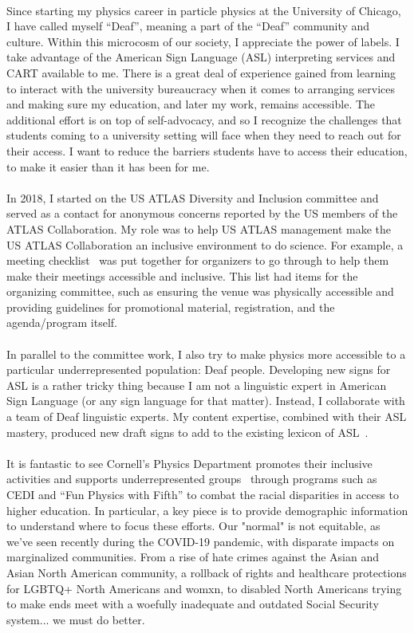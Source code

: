 \documentclass[10pt,a4paper,sans]{moderncv} %
\begin{document}
\\
Since starting my physics career in particle physics at the University of Chicago, I have called myself ``Deaf'', meaning a part of the ``Deaf'' community and culture. Within this microcosm of our society, I appreciate the power of labels. I take advantage of the American Sign Language (ASL) interpreting services and CART available to me. There is a great deal of experience gained from learning to interact with the university bureaucracy when it comes to arranging services and making sure my education, and later my work, remains accessible. The additional effort is on top of self-advocacy, and so I recognize the challenges that students coming to a university setting will face when they need to reach out for their access. I want to reduce the barriers students have to access their education, to make it easier than it has been for me.
\\
\\
In 2018, I started on the US ATLAS Diversity and Inclusion committee and served as a contact for anonymous concerns reported by the US members of the ATLAS Collaboration. My role was to help US ATLAS management make the US ATLAS Collaboration an inclusive environment to do science. For example, a meeting checklist~\cite{Assamagan:2022oka} was put together for organizers to go through to help them make their meetings accessible and inclusive. This list had items for the organizing committee, such as ensuring the venue was physically accessible and providing guidelines for promotional material, registration, and the agenda/program itself.
\\
\\
In parallel to the committee work, I also try to make physics more accessible to a particular underrepresented population: Deaf people. Developing new signs for ASL is a rather tricky thing because I am not a linguistic expert in American Sign Language (or any sign language for that matter). Instead, I collaborate with a team of Deaf linguistic experts. My content expertise, combined with their ASL mastery, produced new draft signs to add to the existing lexicon of ASL~\cite{ICPS2021, MatterInterpretation}.
\\
\\
It is fantastic to see Cornell's Physics Department promotes their inclusive activities and supports underrepresented groups~\cite{diversitypage} through programs such as CEDI and ``Fun Physics with Fifth'' to combat the racial disparities in access to higher education. In particular, a key piece is to provide demographic information to understand where to focus these efforts. Our "normal" is not equitable, as we've seen recently during the COVID-19 pandemic, with disparate impacts on marginalized communities. From a rise of hate crimes against the Asian and Asian North American community, a rollback of rights and healthcare protections for LGBTQ+ North Americans and womxn, to disabled North Americans trying to make ends meet with a woefully inadequate and outdated Social Security system... we must do better.
\end{document}
